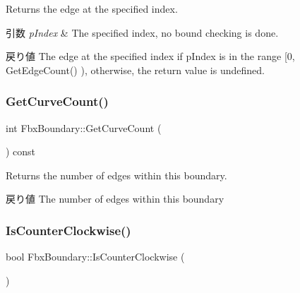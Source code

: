 Returns the edge at the specified index. 
\begin{DoxyParams}{引数}
{\em p\+Index} & The specified index, no bound checking is done. \\
\hline
\end{DoxyParams}
\begin{DoxyReturn}{戻り値}
The edge at the specified index if p\+Index is in the range \mbox{[}0, Get\+Edge\+Count() ), otherwise, the return value is undefined. 
\end{DoxyReturn}
\mbox{\label{class_fbx_boundary_adcd0d41aa9a5804cd74ed14b6b8f6f8a}} 
\subsubsection{\texorpdfstring{Get\+Curve\+Count()}{GetCurveCount()}}
{\footnotesize\ttfamily int Fbx\+Boundary\+::\+Get\+Curve\+Count (\begin{DoxyParamCaption}{ }\end{DoxyParamCaption}) const}

Returns the number of edges within this boundary. \begin{DoxyReturn}{戻り値}
The number of edges within this boundary 
\end{DoxyReturn}
\mbox{\label{class_fbx_boundary_a025f682e72db299620e30eeeebdd1ea7}} 
\subsubsection{\texorpdfstring{Is\+Counter\+Clockwise()}{IsCounterClockwise()}}
{\footnotesize\ttfamily bool Fbx\+Boundary\+::\+Is\+Counter\+Clockwise (\begin{DoxyParamCaption}{ }\end{DoxyParamCaption})}

\mbox{\label{class_fbx_boundary_ad319a0f4511c35710c24b543d30bbee2}} 
